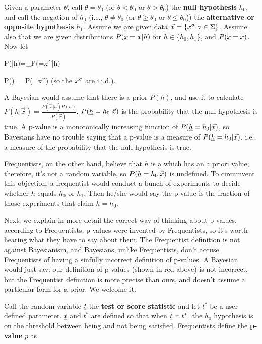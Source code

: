 Given a parameter $\theta$, call
$\theta=\theta_0$ (or  $\theta<\theta_0$ or $\theta>\theta_0$) the
{\bf null hypothesis} $h_0$,
and call the negation of $h_0$ (i.e.,
$\theta\neq\theta_0$ (or  $\theta\geq\theta_0$ or $\theta\leq \theta_0$))
the {\bf alternative or
opposite hypothesis} $h_1$.
Assume we
are given data $\vec{x}=\{x^\sigma|\sigma\in \Sigma\}$. Assume
also that we are given
distributions $P(\rvx=x|h)$ for $h\in \{h_0, h_1\}$,
and $P(\rvx=x)$. Now let

\beq
P(|h)=\prod_\s P(\rvx=x^\s|h)
\eeq


\beq
P()=\prod_\s P(\rvx=x^\s)
\eeq
(so the $x^\sigma$ are i.i.d.).

A Bayesian would assume that there
is a prior $P(h)$, and use it to
calculate
$P(h|\vec{x})=\frac{P(\vec{x}|h) P(h)}{P(\vec{x})}$.
$P(\rvh= h_0|\vec{x})$
is the probability that the null hypothesis is true.
A p-value is a monotonically increasing function of
$P(\rvh= h_0|\vec{x})$,
so Bayesians have no trouble saying
that  {\color{red} a  p-value is
a measure of
$P(\rvh= h_0|\vec{x})$, i.e.,
a measure of the probability that
the null-hypothesis is true}.

Frequentists, on the other hand,
believe that $h$
is a  which has an a priori value; therefore,
it's not a random variable,
so  $P(\rvh= h_0|\vec{x})$
is undefined. To
circumvent this objection, a frequentist
would conduct a bunch of experiments
to decide whether $h$ equals $h_0$
or $h_1$. Then he/she
would say the p-value
is the fraction
of those experiments that claim $h=h_0$.

Next, we explain in more detail the correct
way of thinking about p-values, according to
Frequentists.
p-values were invented by Frequentists,
so it's worth hearing what they have to say
about them.
The Frequentist definition is not against Bayesianism,
and Bayesians, unlike Frequentists,
 don't accuse Frequentists of
having a sinfully incorrect
 definition of p-values. A Bayesian would just say:
our definition of p-values (shown
in red above) is not incorrect,
but the Frequentist definition is more precise than ours,
and doesn't assume a particular form for a prior.
We welcome it.

Call
the random variable
$\rvt$ the {\bf test or score statistic} and let
$t^*$ be a user defined
parameter.
$\rvt$ and $t^*$
are defined so that
when $\rvt=t^*$,
the $h_0$ hypothesis is
on the threshold between
being and not being satisfied.
Frequentists define the {\bf  p-value} $p$ as


